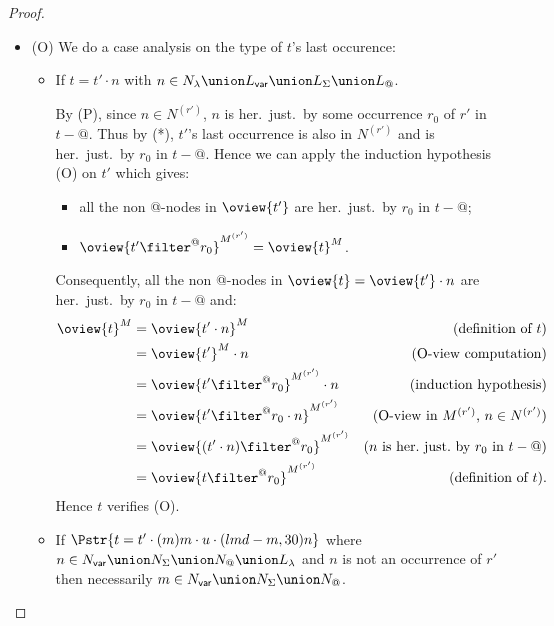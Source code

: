\begin{proof}
\begin{itemize}
\begin{itemize}
    \end{itemize}



\item (O) We do a case analysis on the type of $t$'s last occurence:
    \begin{itemize}

    \item If $t = t' \cdot n$ with $n \in N_\lambda \union L_{\sf var} \union
    L_\Sigma \union L_@$.

    By (P), since $n\in N^{(r')}$, $n$ is her.\ just.\ by some occurrence $r_0$ of $r'$ in $t-@$.
    Thus by (*), $t'$'s last occurrence is also in $N^{(r')}$ and is her.\ just.\ by $r_0$ in $t-@$.
    Hence we can apply the induction hypothesis (O) on $t'$ which gives:
    \begin{itemize}
    \item all the non @-nodes in $\oview{t'}$ are her.\ just.\ by $r_0$ in $t-@$;
    \item $\oview{t' \filter^@  r_0}^{M^{(r')}}  = \oview{t}^M$.
    \end{itemize}

    Consequently, all the non @-nodes in $\oview{t} = \oview{t'} \cdot n$ are her.\ just.\ by $r_0$ in $t-@$
    and:
        \begin{align*}
        \oview{t}^M
    &= \oview{t' \cdot n}^M  & (\mbox{definition of } t)\\
            &= \oview{t'}^M \cdot n  & (\mbox{O-view computation}) \\
            &= \oview{t' \filter^@  r_0 }^{M^{(r')}} \cdot n            & (\mbox{induction hypothesis}) \\
            &= \oview{t' \filter^@  r_0 \cdot n }^{M^{(r')}} & (\mbox{O-view in $M^{(r')}$, $n \in N^{(r')}$}) \\
            &= \oview{(t' \cdot n ) \filter^@  r_0  }^{M^{(r')}}           & (\mbox{$n$ is her.\ just.\ by $r_0$ in $t-@$}) \\
            &= \oview{t \filter^@  r_0  }^{M^{(r')}}
     & (\mbox{definition of } t).
        \end{align*}
    Hence $t$ verifies (O).

    \item If $\Pstr{ t =  t' \cdot (m){m} \cdot u \cdot (lmd-m,30){n} }$
    where $n \in N_{\sf var} \union N_\Sigma \union N_@ \union L_\lambda$  and $n$ is not an occurrence of $r'$ then necessarily $m\in N_{\sf var} \union N_\Sigma \union N_@$.



\end{itemize}
\end{itemize}
\end{proof}

